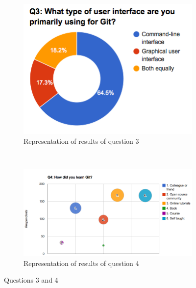 \documentclass[a4paper,oneside]{bth} %
\begin{document}
			\begin{figure}[H]
				\centering
				\begin{subfigure}[b]{0.45\textwidth}
					\includegraphics[width=\textwidth]{graphs/q3.png}
					\caption{Representation of results of question 3}
					\label{fig:q3}
				\end{subfigure}
				~
				\begin{subfigure}[b]{0.45\textwidth}
					\includegraphics[width=\textwidth]{graphs/q4.png}
					\caption{Representation of results of question 4}
					\label{fig:q4}
				\end{subfigure}
				\caption{Questions 3 and 4}\label{fig:q3-q4}
			\end{figure}
\end{document}
